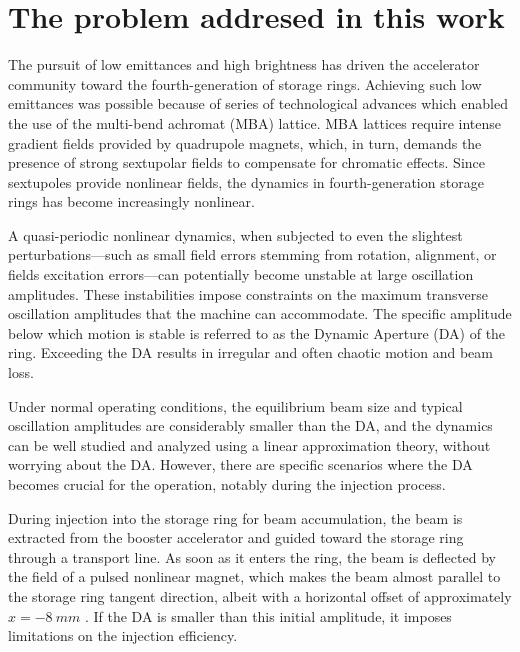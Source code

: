 \section{The problem addresed in this work}
The pursuit of low emittances and high brightness has driven the accelerator community toward the fourth-generation of storage rings. Achieving such low emittances was possible because of series of technological advances which enabled the use of the multi-bend achromat (MBA) lattice\cite{liu_towards_2017,hettel_challenges_2014}. MBA lattices require intense gradient fields provided by quadrupole magnets, which, in turn, demands the presence of strong sextupolar fields to compensate for chromatic effects. Since sextupoles provide nonlinear fields, the dynamics in fourth-generation storage rings has become increasingly nonlinear\cite{liu_towards_2017}.

A quasi-periodic nonlinear dynamics, when subjected to even the slightest perturbations—such as small field errors stemming from rotation, alignment, or fields excitation errors—can potentially become unstable at large oscillation amplitudes. These instabilities impose constraints on the maximum transverse oscillation amplitudes that the machine can accommodate. The specific amplitude below which motion is stable is referred to as the Dynamic Aperture (DA) of the ring. Exceeding the DA results in irregular and often chaotic motion and beam loss.

Under normal operating conditions, the equilibrium beam size and typical oscillation amplitudes are considerably smaller than the DA, and the dynamics can be well studied and analyzed using a linear approximation theory, without worrying about the DA. However, there are specific scenarios where the DA becomes crucial for the operation, notably during the injection process.

During injection into the storage ring for beam accumulation, the beam is extracted from the booster accelerator and guided toward the storage ring through a transport line. As soon as it enters the ring, the beam is deflected by the field of a pulsed nonlinear magnet, which makes the beam almost parallel to the storage ring tangent direction, albeit with a horizontal offset of approximately $x=-8~\unit{mm}$ \cite{liu_injection_2016}. If the DA is smaller than this initial amplitude, it imposes limitations on the injection efficiency.

